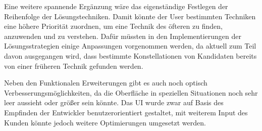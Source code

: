 Eine weitere spannende Ergänzung wäre das eigenständige Festlegen der Reihenfolge der Lösungstechniken. Damit könnte der User bestimmten Techniken eine höhere Priorität zuordnen, um eine Technik des öfteren zu finden, anzuwenden und zu verstehen. Dafür müssten in den Implementierungen der Lösungsstrategien einige Anpassungen vorgenommen werden, da aktuell zum Teil davon ausgegangen wird, dass bestimmte Konstellationen von Kandidaten bereits von einer früheren Technik gefunden werden.

Neben den Funktionalen Erweiterungen gibt es auch noch optisch Verbesserungsmöglichkeiten, da die Oberfläche in speziellen Situationen noch sehr leer aussieht oder größer sein könnte. Das \ac{UI} wurde zwar auf Basis des Empfinden der Entwickler benutzerorientiert gestaltet, mit weiterem Input des Kunden könnte jedoch weitere Optimierungen umgesetzt werden. 

